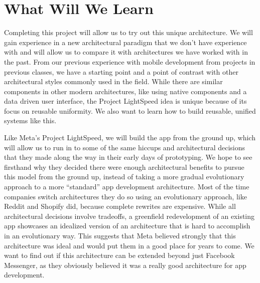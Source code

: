 \documentclass[12pt]{article}
\begin{document}
    \section{What Will We Learn}
    Completing this project will allow us to try out this unique architecture.
    We will gain experience in a new architectural paradigm that we don’t have experience with and will allow us to compare it with architectures we have worked with in the past.
    From our previous experience with mobile development from projects in previous classes, we have a starting point and a point of contrast with other architectural styles commonly used in the field.
    While there are similar components in other modern architectures, like using native components and a data driven user interface, the Project LightSpeed idea is unique because of its focus on reusable uniformity.
    We also want to learn how to build reusable, unified systems like this.

    Like Meta's Project LightSpeed, we will build the app from the ground up, which will allow us to run in to some of the same hiccups and architectural decisions that they made along the way in their early days of prototyping.
    We hope to see firsthand why they decided there were enough architectural benefits to pursue this model from the ground up, instead of taking a more gradual evolutionary approach to a more “standard” app development architecture.
    Most of the time companies switch architectures they do so using an evolutionary approach, like Reddit and Shopify did, because complete rewrites are expensive.
    While all architectural decisions involve tradeoffs, a greenfield redevelopment of an existing app showcases an idealized version of an architecture that is hard to accomplish in an evolutionary way.
    This suggests that Meta believed strongly that this architecture was ideal and would put them in a good place for years to come.
    We want to find out if this architecture can be extended beyond just Facebook Messenger, as they obviously believed it was a really good architecture for app development.

\end{document}
